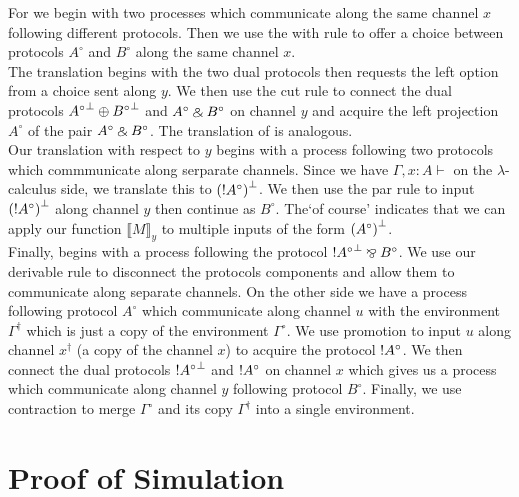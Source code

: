 \noindent
For  we begin with two processes which communicate along the same channel $x$ 
following different protocols. Then we use the with rule to offer a choice between protocols 
$A^\circ$ and $B^\circ$ along the same channel $x$. \\

\noindent
The translation  begins with the two dual protocols then requests the left 
option from a choice sent along $y$. We then use the cut rule to connect the dual protocols 
$\negg{A^\circ} \oplus \negg{B^\circ}$ and $A^\circ \mathbin{\binampersand} B^\circ$ on channel $y$ and acquire 
the left projection $A^\circ$ of the pair $A^\circ \mathbin{\binampersand} B^\circ$. The translation 
of  is analogous. \\

\noindent
Our translation  with respect to $y$ begins with a process following two protocols 
which commmunicate along serparate channels. Since we have $\Gamma, x:A \vdash$ on the $\lambda$-
calculus side, we translate this to $\negg{(\ofc A^\circ)}$. We then use the par rule to input 
$\negg{(\ofc A^\circ)}$ along channel $y$ then continue as $B^\circ$. The`of course' indicates 
that we can apply our function $\llbracket M \rrbracket_y$ to multiple inputs of the form 
$\negg{(A^\circ)}$. \\

\noindent
Finally,  begins with a process following the protocol $\negg{\ofc A^\circ} \parr B^\circ$.
We use our derivable rule  to disconnect the protocols components and allow them to 
communicate along separate channels. On the other side we have a process following protocol $A^\circ$ 
which communicate along channel $u$ with the environment $\Gamma^\dagger$ which is just a copy of 
the environment $\Gamma^\circ$. We use promotion to input $u$ along channel $x^\dagger$ (a copy of the 
channel $x$) to acquire the protocol $\textrm{!} A^\circ$. We then connect 
the dual protocols $\negg{\ofc A^\circ}$ and $\textrm{!} A^\circ$ on channel $x$ which gives us a process 
which communicate along channel $y$ following protocol $B^\circ$. Finally, we use contraction to merge 
$\Gamma^\circ$ and its copy $\Gamma^\dagger$ into a single environment. \\


\section{Proof of Simulation}

